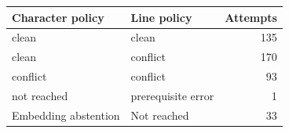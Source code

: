 \begin{tabular}{llr}
\toprule
Character policy & Line policy & Attempts \\
\midrule
clean & clean & 135 \\
clean & conflict & 170 \\
conflict & conflict & 93 \\
not reached & prerequisite error & 1 \\
Embedding abstention & Not reached & 33 \\
\bottomrule
\end{tabular}
